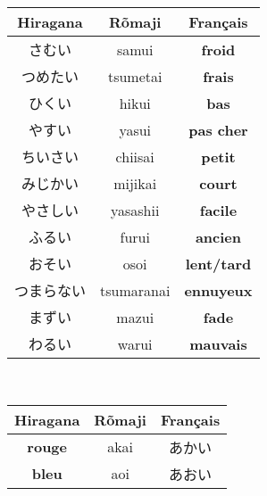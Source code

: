 \documentclass[11pt]{report}
\newenvironment{Japanese}{%
\CJKfamily{min}%
\CJKtilde  
\CJKnospace}{}
\begin{document}
\begin{CJK}{UTF8}{}
\begin{Japanese}
\begin{center}
\begin{multicols}{2}
\begin{tabular}{|c|c|c|}
			\end{tabular}
			\begin{tabular}{|c|c|c|}
				\hline
				\textbf{Hiragana} & \textbf{Rõmaji} & \textbf{Français} \\
				\hline
				さむい & samui & \textbf{froid} \\%
				\hline
				つめたい & tsumetai & \textbf{frais} \\%
				\hline
				ひくい & hikui & \textbf{bas} \\%
				\hline
				やすい & yasui & \textbf{pas cher} \\%
				\hline
				ちいさい & chiisai & \textbf{petit} \\%
				\hline
				みじかい & mijikai & \textbf{court} \\%
				\hline
				やさしい & yasashii & \textbf{facile} \\%
				\hline
				ふるい & furui & \textbf{ancien} \\%
				\hline
				おそい & osoi & \textbf{lent/tard} \\%
				\hline
				つまらない & tsumaranai & \textbf{ennuyeux} \\%
				\hline
				まずい & mazui & \textbf{fade} \\%
				\hline
				わるい & warui & \textbf{mauvais} \\%
				\hline
			\end{tabular}
		\end{multicols}
		~\\
		\begin{tabular}{|c|c|c|}
			\hline
			\textbf{Hiragana} & \textbf{Rõmaji} & \textbf{Français} \\
			\hline
			\textbf{rouge} & akai & あかい \\
			\hline
			\textbf{bleu} & aoi & あおい \\

\end{tabular}
\end{center}
\end{Japanese}
\end{CJK}
\end{document}
